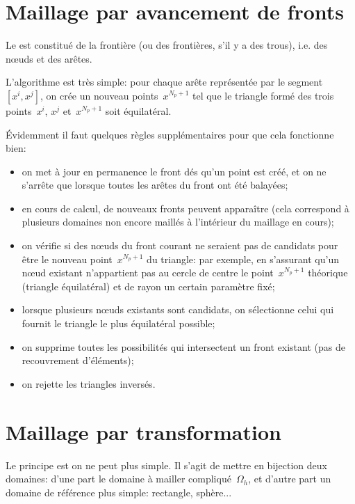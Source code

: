 \medskip
\section{Maillage par avancement de fronts}\label{Sec-MeshFront}

Le  est constitué de la frontière (ou des frontières, s'il y a des trous), i.e. des nœuds et des arêtes.

L'algorithme est très simple: pour chaque arête représentée par le segment~$[x^i,x^j]$, on crée un nouveau points~$x^{N_p+1}$ tel que le triangle formé des trois points~$x^i$, $x^j$ et~$x^{N_p+1}$ soit équilatéral.

\medskip
Évidemment il faut quelques règles supplémentaires pour que cela fonctionne bien:
\begin{itemize}
   \item on met à jour en permanence le front dés qu'un point est créé, et on ne s'arrête que lorsque toutes les arêtes du front ont été balayées;
   \item en cours de calcul, de nouveaux fronts peuvent apparaître (cela correspond à plusieurs domaines non encore maillés à l'intérieur du maillage en cours);
   \item on vérifie si des nœuds du front courant ne seraient pas de candidats pour être le nouveau point~$x^{N_p+1}$ du triangle: par exemple, en s'assurant qu'un nœud existant n'appartient pas au cercle de centre le point~$x^{N_p+1}$ théorique (triangle équilatéral) et de rayon un certain paramètre fixé;
   \item lorsque plusieurs nœuds existants sont candidats, on sélectionne celui qui fournit le triangle le plus équilatéral possible;
   \item on supprime toutes les possibilités qui intersectent un front existant (pas de recouvrement d'éléments);
   \item on rejette les triangles inversés.
\end{itemize}


\medskip
\section{Maillage par transformation}\label{Sec-MeshTransfo}

Le principe est on ne peut plus simple. Il s'agit de mettre en bijection deux domaines: d'une part le domaine à mailler compliqué~$\Omega_h$, et d'autre part un domaine de référence plus simple: rectangle, sphère...

